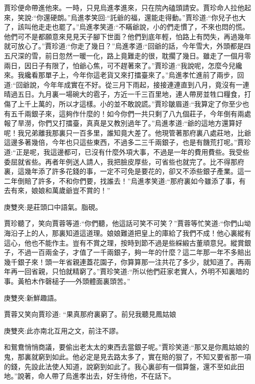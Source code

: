 \begin{parag}
    賈珍便命帶進他來。一時，只見烏進孝進來，只在院內磕頭請安。賈珍命人拉他起來，笑說:“你還硬朗。”烏進孝笑回:“託爺的福，還能走得動。”賈珍道:“你兒子也大了，該叫他走走也罷了。”烏進孝笑道:“不瞞爺說，小的們走慣了，不來也悶的慌。他們可不是都願意來見見天子腳下世面？他們到底年輕，怕路上有閃失，再過幾年就可放心了。”賈珍道:“你走了幾日？”烏進孝道:“回爺的話，今年雪大，外頭都是四五尺深的雪，前日忽然一暖一化，路上竟難走的很，耽擱了幾日。雖走了一個月零兩日，因日子有限了，怕爺心焦，可不趕著來了。”賈珍道:“我說呢，怎麼今兒纔來。我纔看那單子上，今年你這老貨又來打擂臺來了。”烏進孝忙進前了兩步，回道:“回爺說，今年年成實在不好。從三月下雨起，接接連連直到八月，竟沒有一連晴過五日。九月裏一場碗大的雹子，方近一千三百里地，連人帶房並牲口糧食，打傷了上千上萬的，所以才這樣。小的並不敢說謊。”賈珍皺眉道:“我算定了你至少也有五千兩銀子來，這夠作什麼的！如今你們一共只剩了八九個莊子，今年倒有兩處報了旱澇，你們又打擂臺，真真是又教別過年了。”烏進孝道:“爺的這地方還算好呢！我兄弟離我那裏只一百多里，誰知竟大差了。他現管著那府裏八處莊地，比爺這邊多著幾倍，今年也只這些東西，不過多二三千兩銀子，也是有饑荒打呢。”賈珍道:“正是呢，我這邊都可，已沒有什麼外項大事，不過是一年的費用費些。我受些委屈就省些。再者年例送人請人，我把臉皮厚些，可省些也就完了。比不得那府裏，這幾年添了許多花錢的事，一定不可免是要花的，卻又不添些銀子產業。這一二年倒賠了許多，不和你們要，找誰去！”烏進孝笑道:“那府裏如今雖添了事，有去有來，娘娘和萬歲爺豈不賞的！”\begin{note}庚雙夾:是莊頭口中語氣。脂硯。\end{note}賈珍聽了，笑向賈蓉等道:“你們聽，他這話可笑不可笑？”賈蓉等忙笑道:“你們山坳海沿子上的人，那裏知道這道理。娘娘難道把皇上的庫給了我們不成！他心裏縱有這心，他也不能作主。豈有不賞之理，按時到節不過是些綵緞古董頑意兒。縱賞銀子，不過一百兩金子，才值了一千兩銀子，夠一年的什麼？這二年那一年不多賠出幾千銀子來！頭一年省親連蓋花園子，你算算那一注共花了多少，就知道了。再兩年再一回省親，只怕就精窮了。”賈珍笑道:“所以他們莊家老實人，外明不知裏暗的事。黃柏木作磬槌子──外頭體面裏頭苦。”\begin{note}庚雙夾:新鮮趣語。\end{note}賈蓉又笑向賈珍道: “果真那府裏窮了。前兒我聽見鳳姑娘\begin{note}庚雙夾:此亦南北互用之文，前注不謬。\end{note}和鴛鴦悄悄商議，要偷出老太太的東西去當銀子呢。”賈珍笑道:“那又是你鳳姑娘的鬼，那裏就窮到如此。他必定是見去路太多了，實在賠的狠了，不知又要省那一項的錢，先設此法使人知道，說窮到如此了。我心裏卻有一個算盤，還不至如此田地。”說著，命人帶了烏進孝出去，好生待他，不在話下。
\end{parag}


